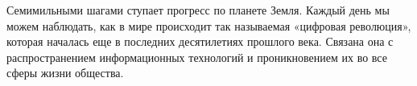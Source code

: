 \label{sec:intro}

Семимильными шагами ступает прогресс по планете Земля. Каждый день мы можем наблюдать,
как в мире происходит так называемая «цифровая революция», которая
началась еще в последних десятилетиях прошлого века. Связана она с распространением
информационных технологий и проникновением их во все сферы жизни общества.